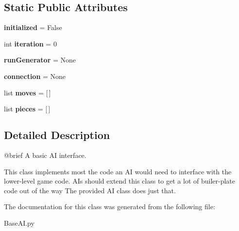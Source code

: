 \subsection*{Static Public Attributes}
\begin{DoxyCompactItemize}
\item 
\hypertarget{classBaseAI_1_1BaseAI_a32a836eb9aad27c111583f24238a686c}{
{\bfseries initialized} = False}
\label{classBaseAI_1_1BaseAI_a32a836eb9aad27c111583f24238a686c}

\item 
\hypertarget{classBaseAI_1_1BaseAI_a54d7182ce68d3d2b55d247c431561f9d}{
int {\bfseries iteration} = 0}
\label{classBaseAI_1_1BaseAI_a54d7182ce68d3d2b55d247c431561f9d}

\item 
\hypertarget{classBaseAI_1_1BaseAI_af78c73cdbcca5a8ed213e2510fbd6e94}{
{\bfseries runGenerator} = None}
\label{classBaseAI_1_1BaseAI_af78c73cdbcca5a8ed213e2510fbd6e94}

\item 
\hypertarget{classBaseAI_1_1BaseAI_a319a81bb1af508789e826e78ee727418}{
{\bfseries connection} = None}
\label{classBaseAI_1_1BaseAI_a319a81bb1af508789e826e78ee727418}

\item 
\hypertarget{classBaseAI_1_1BaseAI_a9106a04e624e5f0da99f5bda529e59a2}{
list {\bfseries moves} = \mbox{[}$\,$\mbox{]}}
\label{classBaseAI_1_1BaseAI_a9106a04e624e5f0da99f5bda529e59a2}

\item 
\hypertarget{classBaseAI_1_1BaseAI_a1a0a022fb350336d7903bb86b25db1cf}{
list {\bfseries pieces} = \mbox{[}$\,$\mbox{]}}
\label{classBaseAI_1_1BaseAI_a1a0a022fb350336d7903bb86b25db1cf}

\end{DoxyCompactItemize}


\subsection{Detailed Description}
\begin{DoxyVerb}@brief A basic AI interface.

This class implements most the code an AI would need to interface with the lower-level game code.
AIs should extend this class to get a lot of builer-plate code out of the way
The provided AI class does just that.
\end{DoxyVerb}
 

The documentation for this class was generated from the following file:\begin{DoxyCompactItemize}
\item 
BaseAI.py\end{DoxyCompactItemize}
